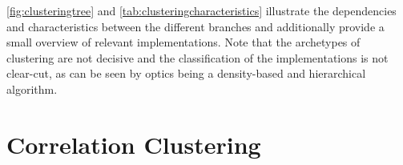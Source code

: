 
\autoref{fig:clusteringtree} and \autoref{tab:clusteringcharacteristics} illustrate the dependencies and characteristics between the different branches and additionally provide a small overview of relevant implementations. Note that the archetypes of clustering are not decisive and the classification of the implementations is not clear-cut, as can be seen by \acrshort{optics} being a density-based and hierarchical algorithm. 


\break
\section{Correlation Clustering}\label{sec:subspaceclu}

